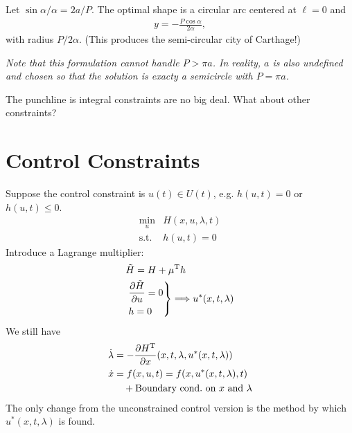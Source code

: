 Let $\sin\alpha/\alpha = 2a/P$. The optimal shape is a circular arc centered at $\ell=0$ and
\begin{gather}
  y = - \frac{P\cos\alpha}{2\alpha},
\end{gather}
with radius $P/2\alpha$. (This produces the semi-circular city of Carthage!)
\begin{center}
\end{center}
\emph{Note that this formulation cannot handle $P>\pi a$. In reality, $a$ is also undefined and chosen so that the solution is exacty a semicircle with $P=\pi a$.}

The punchline is integral constraints are no big deal. What about other constraints?

\section{Control Constraints}
Suppose the control constraint is $u(t)\in U(t)$, e.g. $h(u,t)=0$ or $h(u,t)\le 0$.
\begin{align}
  \min_u {} & H(x,u,\lambda,t) \\
  \text{s.t. } & h(u,t) = 0
\end{align}
Introduce a Lagrange multiplier:
\begin{align}
  & \tilde H = H + \mu^\text{T} h \\
  & \left. \begin{aligned}
    & \frac{\partial \tilde H}{\partial u} = 0 \\
    & h = 0
  \end{aligned} \right\} \Longrightarrow u^*(x,t,\lambda)
\end{align}
We still have
\begin{align}
  \dot\lambda &= -\frac{\partial H^\text{T}}{\partial x} (x,t,\lambda,u^*(x,t,\lambda)) \\
  \dot x &= f(x,u,t) = f(x,u^*(x,t,\lambda),t) \\
              & \quad + \text{Boundary cond.\ on $x$ and $\lambda$}
\end{align}
The only change from the unconstrained control version is the method by which $u^*(x,t,\lambda)$ is found.

